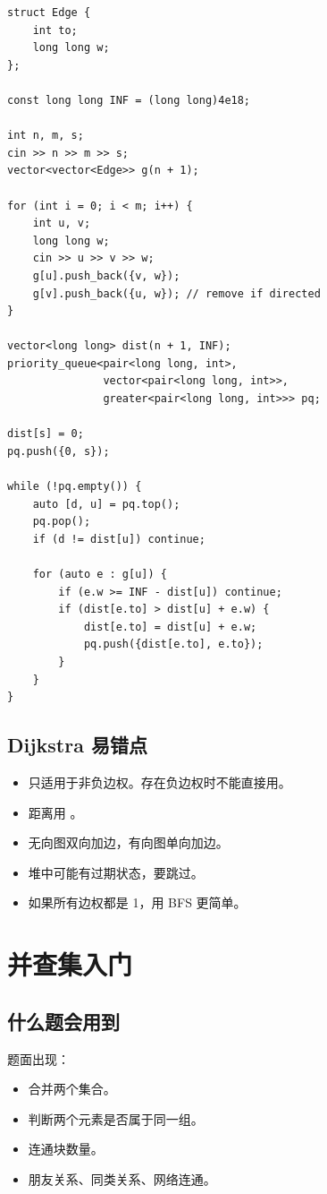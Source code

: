 \begin{lstlisting}
struct Edge {
    int to;
    long long w;
};

const long long INF = (long long)4e18;

int n, m, s;
cin >> n >> m >> s;
vector<vector<Edge>> g(n + 1);

for (int i = 0; i < m; i++) {
    int u, v;
    long long w;
    cin >> u >> v >> w;
    g[u].push_back({v, w});
    g[v].push_back({u, w}); // remove if directed
}

vector<long long> dist(n + 1, INF);
priority_queue<pair<long long, int>,
               vector<pair<long long, int>>,
               greater<pair<long long, int>>> pq;

dist[s] = 0;
pq.push({0, s});

while (!pq.empty()) {
    auto [d, u] = pq.top();
    pq.pop();
    if (d != dist[u]) continue;

    for (auto e : g[u]) {
        if (e.w >= INF - dist[u]) continue;
        if (dist[e.to] > dist[u] + e.w) {
            dist[e.to] = dist[u] + e.w;
            pq.push({dist[e.to], e.to});
        }
    }
}
\end{lstlisting}

\subsection{Dijkstra 易错点}

\begin{itemize}
  \item 只适用于非负边权。存在负边权时不能直接用。
  \item 距离用 。
  \item 无向图双向加边，有向图单向加边。
  \item 堆中可能有过期状态，要跳过。
  \item 如果所有边权都是 1，用 BFS 更简单。
\end{itemize}

\section{并查集入门}\label{sec:06-22}

\subsection{什么题会用到}

题面出现：

\begin{itemize}
  \item 合并两个集合。
  \item 判断两个元素是否属于同一组。
  \item 连通块数量。
  \item 朋友关系、同类关系、网络连通。
\end{itemize}

